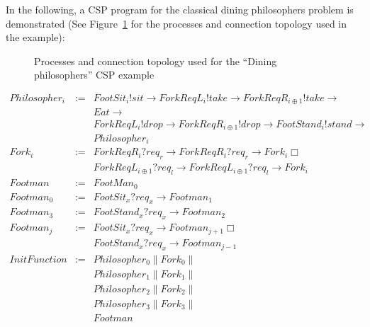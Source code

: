 %  

In the following, a CSP program for the classical dining
philosophers problem is demonstrated (See Figure~\ref{fig:dining-philosophers}
for the processes and connection topology used in the example):

\begin{figure}[h]
\centering

\caption{Processes and connection topology used for the ``Dining philosophers'' CSP example}
\label{fig:dining-philosophers}
\end{figure}

\begin{displaymath}
\begin{array}{rcl}
Philosopher_{i}    & := & FootSit_{i}!sit \to ForkReqL_{i}!take \to ForkReqR_{i\oplus1}!take \to \\
		   &    & Eat \to \\
		   &    & ForkReqL_{i}!drop \to ForkReqR_{i\oplus1}!drop \to FootStand_{i}!stand \to \\
		   &	& Philosopher_{i} \\
Fork_{i}	   & := & ForkReqR_{i}?req_{r} \to ForkReqR_{i}?req_{r} \to Fork_{i} \Box \\
		   &    & ForkReqL_{i\oplus1}?req_{l} \to ForkReqL_{i\oplus1}?req_{l} \to Fork_{i} \\
Footman		   & := & FootMan_{0} \\
Footman_{0}	   & := & FootSit_{x}?req_{x} \to Footman_{1} \\
Footman_{3}	   & := & FootStand_{x}?req_{x} \to Footman_{2} \\
Footman_{j}	   & := & FootSit_{x}?req_{x} \to Footman_{j+1} \Box \\
		   &    & FootStand_{x}?req_{x} \to Footman_{j-1} \\
InitFunction       & := & Philosopher_{0} \| Fork_{0} \| \\
		   &    & Philosopher_{1} \| Fork_{1} \| \\
		   &    & Philosopher_{2} \| Fork_{2} \| \\
		   &    & Philosopher_{3} \| Fork_{3} \| \\
		   &    & Footman \\
\end{array}
\end{displaymath}

